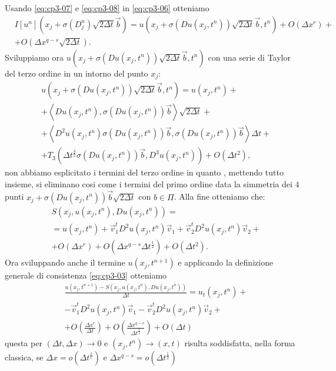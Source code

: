Usando \eqref{eq:cp3-07} e \eqref{eq:cp3-08} in \eqref{eq:cp3-06} otteniamo
\[
\begin{split}
&I[u^n](x_j+\sigma(D_j^n)\sqrt{2\Delta t}\vec{b})=u(x_j+\sigma(Du(x_j,t^n))\sqrt{2\Delta t}\vec{b},t^n)+O(\Delta x^r)+ \\
& +O(\Delta x^{q-s}\sqrt{2\Delta t}).
\end{split}
\]
Sviluppiamo ora $u(x_j+\sigma(Du(x_j,t^n))\sqrt{2\Delta t}\vec{b},t^n)$ con una serie di Taylor del terzo ordine in un intorno del punto $x_j$:
\begin{equation}
\label{eq:cp3-09}
\begin{split}
&u(x_j+\sigma(Du(x_j,t^n))\sqrt{2\Delta t}\vec{b},t^n) = u(x_j,t^n)+ \\
&+\left<Du(x_j,t^n),\sigma(Du(x_j,t^n))\vec{b}\right>\sqrt{2\Delta t} +\\
&+\left<D^2u(x_j,t^n)\sigma(Du(x_j,t^n))\vec{b},\sigma(Du(x_j,t^n))\vec{b}\right>\Delta t + \\
&+T_3(\Delta t^{\frac{3}{2}}\sigma(Du(x_j,t^n))\vec{b},D^3u(x_j,t^n))+O(\Delta t^2), 
\end{split}
\end{equation}
non abbiamo esplicitato i termini del terzo ordine in quanto , mettendo tutto insieme, si eliminano cosi come i termini del primo ordine data la simmetria dei $4$ punti $x_j+\sigma(Du(x_j,t^n))\vec{b}\sqrt{2\Delta t}$ con $b\in\Pi$. Alla fine otteniamo che:
\begin{equation}
\label{eq:cp3-010}
\begin{split}
& S(x_j,u(x_j,t^n),Du(x_j,t^n)) = \\
& = u(x_j,t^n) + \vec{v}_1^tD^2u(x_j,t^n)\vec{v}_1 + \vec{v}_2^tD^2u(x_j,t^n)\vec{v}_2 + \\
& + O(\Delta x^r) + O(\Delta x^{q-s}\Delta t^{\frac{1}{2}}) + O(\Delta t^2).
\end{split}
\end{equation}
Ora sviluppando  anche il termine $u(x_j,t^{n+1})$ e applicando la definizione generale di consistenza \eqref{eq:cp3-03} otteniamo 
\[
\begin{split}
&\frac{u(x_j,t^{n+1})-S(x_j,u(x_j,t^n),Du(x_j,t^n))}{\Delta t}= u_t(x_j,t^n) + \\
&  -\vec{v}_1^tD^2u(x_j,t^n)\vec{v}_1 -\vec{v}_2^tD^2u(x_j,t^n)\vec{v}_2 + \\
& +O(\frac{\Delta x^r}{\Delta t}) + O(\frac{\Delta x^{q-s}}{\Delta t^{\frac{1}{2}}}) + O(\Delta t)
\end{split}
\]
questa per $(\Delta t,\Delta x)\to 0$ e $(x_j,t^n)\to(x,t)$ risulta
soddisfatta, nella forma classica, se $\Delta x = o(\Delta
t^{\frac{1}{r}})$ e $\Delta x^{q-s}=o(\Delta t^{\frac{1}{2}})$

